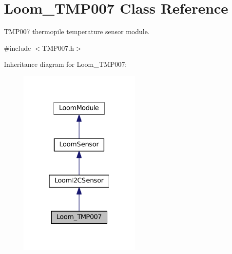 \hypertarget{class_loom___t_m_p007}{}\section{Loom\+\_\+\+T\+M\+P007 Class Reference}
\label{class_loom___t_m_p007}


T\+M\+P007 thermopile temperature sensor module.  




{\ttfamily \#include $<$T\+M\+P007.\+h$>$}



Inheritance diagram for Loom\+\_\+\+T\+M\+P007\+:\nopagebreak
\begin{figure}[H]
\begin{center}
\leavevmode
\includegraphics[width=172pt]{class_loom___t_m_p007__inherit__graph}
\end{center}
\end{figure}

